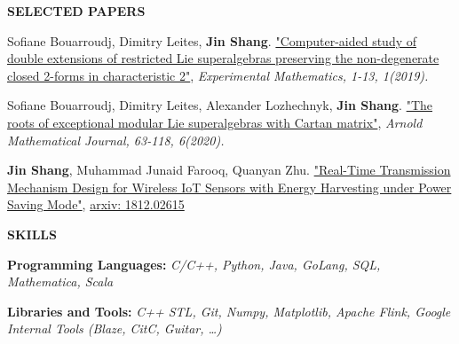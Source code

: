 \documentclass[letterpaper,11pt]{article}
\newcommand{\resheading}[1]{{\large \colorbox{mygrey}{\begin{minipage}{\linewidth}{\textbf{#1 \vphantom{p\^{E}}}}\end{minipage}}}}
\begin{document}
\resheading{SELECTED PAPERS}
\begin{description}
	
	\item \footnotesize Sofiane Bouarroudj, Dimitry Leites, \textbf{Jin Shang}. \href{https://arxiv.org/abs/1904.09579}{"Computer-aided study of double extensions of restricted Lie superalgebras preserving the non-degenerate closed 2-forms in characteristic 2"}, \textit{Experimental Mathematics, 1-13, 1(2019).} 
	\item \footnotesize Sofiane Bouarroudj, Dimitry Leites, Alexander Lozhechnyk, \textbf{Jin Shang}. \href{https://arxiv.org/abs/1904.09578}{"The roots of exceptional modular Lie superalgebras with Cartan matrix"}, \textit{Arnold Mathematical Journal, 63-118, 6(2020).} 
	\item \footnotesize  \textbf{Jin Shang}, Muhammad Junaid Farooq, Quanyan Zhu. \href{https://arxiv.org/abs/1812.02615}{"Real-Time Transmission Mechanism Design for Wireless IoT Sensors with Energy Harvesting under Power Saving Mode"}, \href{https://arxiv.org/abs/1812.02615}{arxiv: 1812.02615}
\end{description}
\resheading{SKILLS}
\begin{description}
	\item \footnotesize \textbf{Programming Languages:} \textit{C/C++, Python, Java, GoLang,  SQL, Mathematica, Scala}
	\item \footnotesize \textbf{Libraries and Tools:} \textit{C++ STL, Git, Numpy, Matplotlib, Apache Flink, Google Internal Tools (Blaze, CitC, Guitar, \dots)}
\end{description}

	
\end{document}
